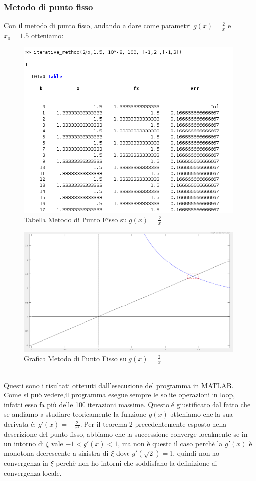 \documentclass[12pt, letterpaper]{article}
\begin{document}
\subsubsection{Metodo di punto fisso}
Con il metodo di punto fisso, andando a dare come parametri $g(x)=\frac{2}{x}$ e $x_0=1.5$ otteniamo:
\begin{figure}[ht!]
    \includegraphics[scale=0.60]{TabellaParabolaPuntoFisso.png}
    \caption{Tabella Metodo di Punto Fisso su $g(x)=\frac{2}{x}$ }
\end{figure}
\begin{figure}[ht!]
    \includegraphics[scale=0.39]{ParabolaPuntoFisso.png} 
    \caption{Grafico Metodo di Punto Fisso su $g(x)=\frac{2}{x}$}
\end{figure} \\

Questi sono i risultati ottenuti dall'esecuzione del programma in MATLAB.\\ Come si può vedere,il programma esegue sempre le solite operazioni in loop, infatti esso fa più delle 100 iterazioni massime.
Questo \'e giustificato dal fatto che se andiamo a studiare teoricamente la funzione $g(x)$ otteniamo che la sua derivata \'e: $g'(x)=-\frac{2}{x^2}$. Per il teorema 2 precedentemente esposto nella descrizione del punto fisso, abbiamo che la successione
converge localmente se in un intorno di $\xi$ vale $-1<g'(x)<1$, ma non è questo il caso perchè la $g'(x)$ è monotona decrescente a sinistra di $\xi$ dove $g'(\sqrt{2})=1$, quindi non ho convergenza in $\xi$ perchè non ho intorni che soddisfano la definizione di convergenza locale. 
\newpage
\end{document}
